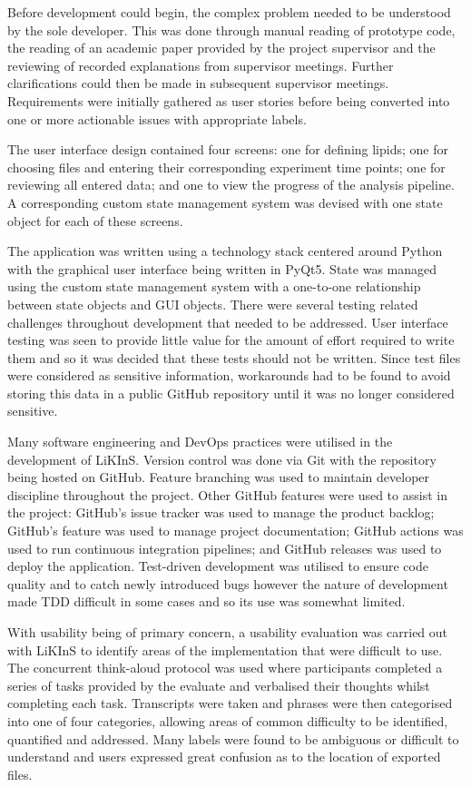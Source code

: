 \documentclass{l4proj}
\begin{document}
Before development could begin, the complex problem needed to be understood by the sole developer. This was done through manual reading of prototype code, the reading of an academic paper provided by the project supervisor and the reviewing of recorded explanations from supervisor meetings. Further clarifications could then be made in subsequent supervisor meetings. Requirements were initially gathered as user stories before being converted into one or more actionable issues with appropriate labels.

The user interface design contained four screens: one for defining lipids; one for choosing files and entering their corresponding experiment time points; one for reviewing all entered data; and one to view the progress of the analysis pipeline. A corresponding custom state management system was devised with one state object for each of these screens. 

The application was written using a technology stack centered around Python with the graphical user interface being written in PyQt5. State was managed using the custom state management system with a one-to-one relationship between state objects and GUI objects. There were several testing related challenges throughout development that needed to be addressed. User interface testing was seen to provide little value for the amount of effort required to write them and so it was decided that these tests should not be written. Since test files were considered as sensitive information, workarounds had to be found to avoid storing this data in a public GitHub repository until it was no longer considered sensitive.

Many software engineering and DevOps practices were utilised in the development of LiKInS. Version control was done via Git with the repository being hosted on GitHub. Feature branching was used to maintain developer discipline throughout the project. Other GitHub features were used to assist in the project: GitHub's issue tracker was used to manage the product backlog; GitHub's  feature was used to manage project documentation; GitHub actions was used to run continuous integration pipelines; and GitHub releases was used to deploy the application. Test-driven development was utilised to ensure code quality and to catch newly introduced bugs however the nature of development made TDD difficult in some cases and so its use was somewhat limited.

With usability being of primary concern, a usability evaluation was carried out with LiKInS to identify areas of the implementation that were difficult to use. The concurrent think-aloud protocol was used where participants completed a series of tasks provided by the evaluate and verbalised their thoughts whilst completing each task. Transcripts were taken and phrases were then categorised into one of four categories, allowing areas of common difficulty to be identified, quantified and addressed. Many labels were found to be ambiguous or difficult to understand and users expressed great confusion as to the location of exported files.
\end{document}
